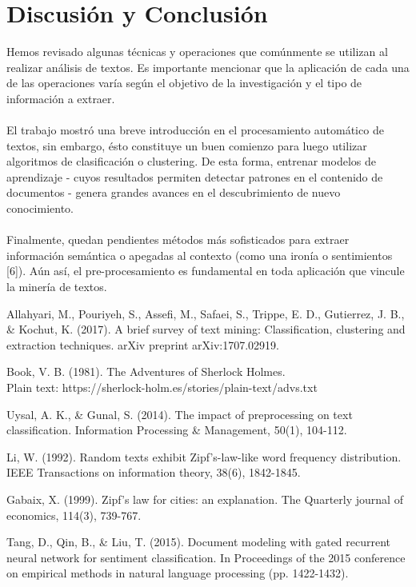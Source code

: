 \documentclass[conference]{IEEEtran}
\begin{document}
\section{Discusión y Conclusión}
Hemos revisado algunas técnicas y operaciones que comúnmente se utilizan al realizar análisis de textos. Es importante mencionar que la aplicación de cada una de las operaciones varía según el objetivo de la investigación y el tipo de información a extraer.\\\\El trabajo mostró una breve introducción en el procesamiento automático de textos, sin embargo, ésto constituye un buen comienzo para luego utilizar algoritmos de clasificación o clustering. De esta forma, entrenar modelos de aprendizaje - cuyos resultados permiten detectar patrones en el contenido de documentos - genera grandes avances en el descubrimiento de nuevo conocimiento.\\\\Finalmente, quedan pendientes métodos más sofisticados para extraer información semántica o apegadas al contexto (como una ironía o sentimientos [6]). Aún así, el pre-procesamiento es fundamental en toda aplicación que vincule la minería de textos.  
\begin{thebibliography}{1}

Allahyari, M., Pouriyeh, S., Assefi, M., Safaei, S., Trippe, E. D., Gutierrez, J. B., \& Kochut, K. (2017). A brief survey of text mining: Classification, clustering and extraction techniques. arXiv preprint arXiv:1707.02919.

Book, V. B. (1981). The Adventures of Sherlock Holmes. \\Plain text: https://sherlock-holm.es/stories/plain-text/advs.txt

Uysal, A. K., \& Gunal, S. (2014). The impact of preprocessing on text classification. Information Processing \& Management, 50(1), 104-112.

Li, W. (1992). Random texts exhibit Zipf's-law-like word frequency distribution. IEEE Transactions on information theory, 38(6), 1842-1845.

Gabaix, X. (1999). Zipf's law for cities: an explanation. The Quarterly journal of economics, 114(3), 739-767.

Tang, D., Qin, B., \& Liu, T. (2015). Document modeling with gated recurrent neural network for sentiment classification. In Proceedings of the 2015 conference on empirical methods in natural language processing (pp. 1422-1432).
\end{thebibliography}




\end{document}
